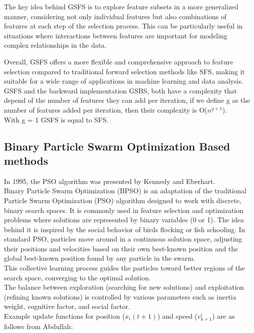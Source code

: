 \documentclass{Configuration_Files/PoliMi3i_thesis}
\begin{document}
The key idea behind GSFS is to explore feature subsets in a more generalized manner, considering not only individual features but also combinations of features at each step of the selection process. This can be particularly useful in situations where interactions between features are important for modeling complex relationships in the data.

Overall, GSFS offers a more flexible and comprehensive approach to feature selection compared to traditional forward selection methods like SFS, making it suitable for a wide range of applications in machine learning and data analysis. \cite{radmanGeneralizedSequentialForward2019}
GSFS and the backward implementation GSBS, both have a complexity that depend of the number of features they can add per iteration, if we define g as the number of features added per iteration, then their complexity is O($n^{g+1}$). \\
 With g = 1 GSFS is equal to SFS.

\subsection{Binary Particle Swarm Optimization Based methods}

In 1995, the PSO algorithm was presented by Kennedy and Eberhart. \cite{okwuMetaheuristicOptimizationNatureInspired2020} \\
Binary Particle Swarm Optimization (BPSO) is an adaptation of the traditional Particle Swarm Optimization (PSO) algorithm designed to work with discrete, binary search spaces. It is commonly used in feature selection and optimization problems where solutions are represented by binary variables (0 or 1).
The idea behind it is inspired by the social behavior of birds flocking or fish schooling. \cite{vanneschiParticleSwarmOptimization2023}
In standard PSO, particles move around in a continuous solution space, adjusting their positions and velocities based on their own best-known position and the global best-known position found by any particle in the swarm.
\\
This collective learning process guides the particles toward better regions of the search space, converging to the optimal solution. \\
The balance between exploration (searching for new solutions) and exploitation (refining known solutions) is controlled by various parameters such as inertia weight, cognitive factor, and social factor. \\
Example update functions for position ($x_{i}(t+1)$) and speed ($v^{i}_{k+1}$) are as follows from Abdullah\cite{abdullahEEGChannelSelection2022}:
\end{document}
